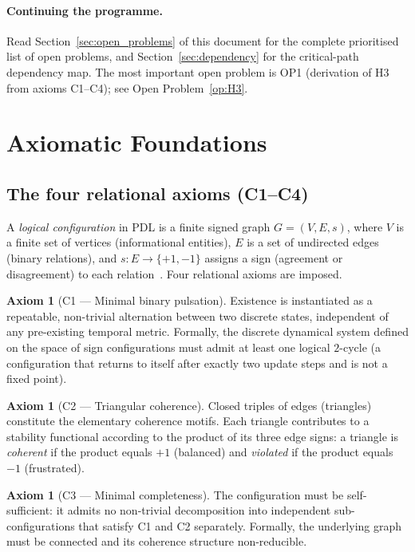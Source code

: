 \documentclass[11pt,a4paper]{article}
\theoremstyle{plain}
\theoremstyle{definition}
\newtheorem{axiom}[theorem]{Axiom}
\theoremstyle{remark}
\begin{document}
\paragraph{Continuing the programme.}
Read Section~\ref{sec:open_problems} of this document for the complete prioritised list of open problems, and Section~\ref{sec:dependency} for the critical-path dependency map.
The most important open problem is OP1 (derivation of H3 from axioms C1--C4); see Open Problem~\ref{op:H3}.

\section{Axiomatic Foundations}
\label{sec:axioms}

\subsection{The four relational axioms (C1--C4)}
\label{subsec:axioms}

A \emph{logical configuration} in PDL is a finite signed graph $G=(V,E,s)$, where $V$ is a finite set of vertices (informational entities), $E$ is a set of undirected edges (binary relations), and $s\colon E\to\{+1,-1\}$ assigns a sign (agreement or disagreement) to each relation~\citep{D01,D02}.
Four relational axioms are imposed.

\begin{axiom}[C1 — Minimal binary pulsation]
Existence is instantiated as a repeatable, non-trivial alternation between two discrete states, independent of any pre-existing temporal metric.
Formally, the discrete dynamical system defined on the space of sign configurations must admit at least one logical $2$-cycle (a configuration that returns to itself after exactly two update steps and is not a fixed point).
\end{axiom}

\begin{axiom}[C2 — Triangular coherence]
Closed triples of edges (triangles) constitute the elementary coherence motifs.
Each triangle contributes to a stability functional according to the product of its three edge signs: a triangle is \emph{coherent} if the product equals $+1$ (balanced) and \emph{violated} if the product equals $-1$ (frustrated).
\end{axiom}

\begin{axiom}[C3 — Minimal completeness]
The configuration must be self-sufficient: it admits no non-trivial decomposition into independent sub-configurations that satisfy C1 and C2 separately.
Formally, the underlying graph must be connected and its coherence structure non-reducible.
\end{axiom}
\end{document}
